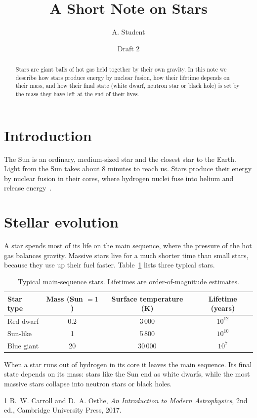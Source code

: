 \documentclass[11pt]{article}
\title{A Short Note on Stars}
\author{A. Student}
\date{Draft 2}
\begin{document}
\maketitle

\begin{abstract}
Stars are giant balls of hot gas held together by their own gravity. In this note
we describe how stars produce energy by nuclear fusion, how their lifetime depends
on their mass, and how their final state (white dwarf, neutron star or black hole)
is set by the mass they have left at the end of their lives.
\end{abstract}

\section{Introduction}

The Sun is an ordinary, medium-sized star and the closest star to the Earth.
Light from the Sun takes about 8 minutes to reach us. Stars produce their energy by
nuclear fusion in their cores, where hydrogen nuclei fuse into helium and release
energy~\cite{carroll}.

\section{Stellar evolution}

A star spends most of its life on the main sequence, where the pressure of the hot
gas balances gravity. Massive stars live for a much shorter time than small stars,
because they use up their fuel faster. Table~\ref{tab:stars} lists three typical
stars.

\begin{table}[h]
\centering
\caption{Typical main-sequence stars. Lifetimes are order-of-magnitude estimates.}
\label{tab:stars}
\begin{tabular}{lccc}
\toprule
Star type & Mass (Sun $=1$) & Surface temperature (K) & Lifetime (years) \\
\midrule
Red dwarf   & 0.2 & 3\,000  & $10^{12}$ \\
Sun-like    & 1   & 5\,800  & $10^{10}$ \\
Blue giant  & 20  & 30\,000 & $10^{7}$ \\
\bottomrule
\end{tabular}
\end{table}

When a star runs out of hydrogen in its core it leaves the main sequence. Its final
state depends on its mass: stars like the Sun end as white dwarfs, while the most
massive stars collapse into neutron stars or black holes.

\begin{thebibliography}{1}
 B.~W. Carroll and D.~A. Ostlie, \emph{An Introduction to Modern
Astrophysics}, 2nd ed., Cambridge University Press, 2017.
\end{thebibliography}
\end{document}
